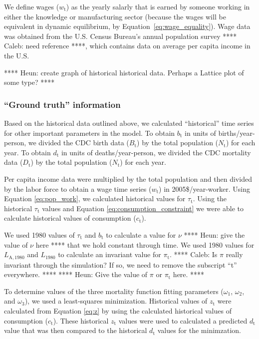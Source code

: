 \documentclass[letterpaper,12pt]{article}
\begin{document}
We define wages ($w_\mathrm{t}$) as the yearly salarly that is earned by someone working in either the knowledge or manufacturing sector (because the wages will be equivalent in dynamic equilibrium, by Equation~\ref{eq:wage_equality}). Wage data was obtained from the U.S. Census Bureau's annual population survey **** Caleb: need reference ****, which contains data on average per capita income in the U.S.

**** Heun: create graph of historical historical data. Perhaps a Lattice plot of some type? ****

\subsubsection{``Ground truth'' information}
\label{sec:basic_model_ground_truth}

Based on the historical data outlined above, we calculated ``historical'' time series for other important parameters in the model. To obtain $b_\mathrm{t}$ in units of births/year-person, we divided the CDC birth data ($B_\mathrm{t}$) by the total population ($N_\mathrm{t}$) for each year. To obtain $d_\mathrm{t}$ in units of deaths/year-person, we divided the CDC mortality data ($D_\mathrm{t}$) by the total population ($N_\mathrm{t}$) for each year.

Per capita income data were multiplied by the total population and then divided by the labor force to obtain a wage time series ($w_\mathrm{t}$) in 2005\$/year-worker. Using Equation \ref{eq:pop_work}, we calculated historical values for $\tau_\mathrm{t}$. Using the historical $\tau_\mathrm{t}$ values and Equation \ref{eq:consumption_constraint} we were able to calculate historical values of consumption ($c_\mathrm{t}$). 

We used 1980 values of $\tau_\mathrm{t}$ and $b_\mathrm{t}$ to calculate a value for $\nu$ **** Heun: give the value of $\nu$ here **** that we hold constant through time. We used 1980 values for $L_\mathrm{A,1980}$ and $L_{1980}$ to calculate an invariant value for $\pi_\mathrm{t}$. **** Caleb: Is $\pi$ really invariant through the simulation? If so, we need to remove the subscript ``t'' everywhere. **** **** Heun: Give the value of $\pi$ or $\pi_\mathrm{t}$ here. ****

To determine values of the three mortality function fitting parameters ($\omega_\mathrm{1}$, $\omega_\mathrm{2}$, and $\omega_\mathrm{3}$), we used a least-squares minimization. Historical values of $z_\mathrm{t}$ were calculated from Equation \ref{eq:z} by using the calculated historical values of consumption ($c_\mathrm{t}$). These historical $z_\mathrm{t}$ values were used to calculated a predicted $d_\mathrm{t}$ value that was then compared to the historical $d_\mathrm{t}$ values for the minimzation. 
\end{document}
